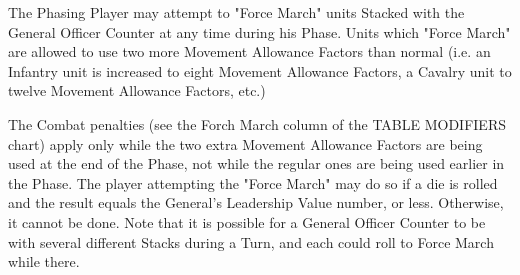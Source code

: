 \begin{enumerate}
  The Phasing Player may attempt to "Force March" units Stacked with the General Officer Counter at any time during his Phase. Units which "Force March" are allowed to use two more Movement Allowance Factors than normal (i.e. an Infantry unit is increased to eight Movement Allowance Factors, a Cavalry unit to twelve Movement Allowance Factors, etc.)

  The Combat penalties (see the Forch March column of the TABLE MODIFIERS chart) apply only while the two extra Movement Allowance Factors are being used at the end of the Phase, not while the regular ones are being used earlier in the Phase. The player attempting the "Force March" may do so if a die is rolled and the result equals the General's Leadership Value number, or less. Otherwise, it cannot be done. Note that it is possible for a General Officer Counter to be with several different Stacks during a Turn, and each could roll to Force March while there.
\end{enumerate}